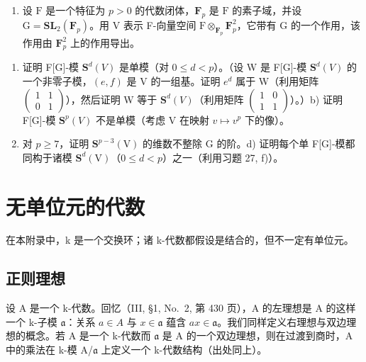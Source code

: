 \begin{enumerate}
\def\labelenumi{\arabic{enumi})}
\setcounter{enumi}{29}
\tightlist
\item
  设 \(\mathrm{F}\) 是一个特征为 \(p > 0\) 的代数闭体，\(\mathbf{F}_p\) 是 \(\mathrm{F}\) 的素子域，并设 \(\mathrm{G} = \mathbf{SL}_2(\mathbf{F}_p)\)。用 \(\mathrm{V}\) 表示 F-向量空间 \(\mathrm{F} \otimes_{\mathbf{F}_p} \mathbf{F}_p^2\)，它带有 \(\mathrm{G}\) 的一个作用，该作用由 \(\mathbf{F}_p^2\) 上的作用导出。
\end{enumerate}

\begin{enumerate}
\def\labelenumi{\alph{enumi})}
\item
  证明 F{[}G{]}-模 \(\mathbf{S}^{d}(V)\) 是单模（对 \(0 \leqslant d < p\)）。（设 W 是 F{[}G{]}-模 \(\mathbf{S}^{d}(V)\) 的一个非零子模，\((e, f)\) 是 V 的一组基。证明 \(e^{d}\) 属于 W（利用矩阵 \(\begin{pmatrix}1 & 1 \\ 0 & 1\end{pmatrix}\)），然后证明 W 等于 \(\mathbf{S}^{d}(V)\)（利用矩阵 \(\begin{pmatrix}1 & 0 \\ 1 & 1\end{pmatrix}\)）。）b) 证明 F{[}G{]}-模 \(\mathbf{S}^{p}(V)\) 不是单模（考虑 V 在映射 \(v \mapsto v^{p}\) 下的像）。
\setcounter{enumi}{2}
\item
  对 \(p \geqslant 7\)，证明 \(\mathbf{S}^{p-3}(\mathrm{V})\) 的维数不整除 G 的阶。d) 证明每个单 F{[}G{]}-模都同构于诸模 \(\mathbf{S}^{d}(\mathrm{V})\)（\(0 \leqslant d < p\)）之一（利用习题 27, f)）。
\end{enumerate}

\appendix
\renewcommand{\thechapter}{\arabic{chapter}}
\chapter{无单位元的代数}

在本附录中，k 是一个交换环；诸 k-代数都假设是结合的，但不一定有单位元。

\section{正则理想}

设 A 是一个 k-代数。回忆（III, §1, No.~2, 第 430 页），A 的左理想是 A 的这样一个 k-子模 \(\mathfrak{a}\)：关系 \(a \in A\) 与 \(x \in \mathfrak{a}\) 蕴含 \(ax \in \mathfrak{a}\)。我们同样定义右理想与双边理想的概念。若 A 是一个 k-代数而 \(\mathfrak{a}\) 是 A 的一个双边理想，则在过渡到商时，A 中的乘法在 k-模 A/\(\mathfrak{a}\) 上定义一个 k-代数结构（出处同上）。

